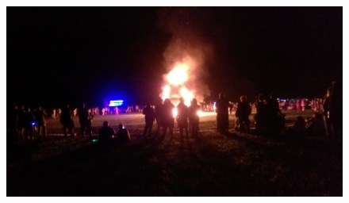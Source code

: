 
\vfill
\begin{figure}[h!]
\centering
\includegraphics[width=.9\textwidth]{images/filler-images/TTM2017EffigyBurn.jpg}
\label{image:2017effigyburn}
\end{figure}
\vfill

